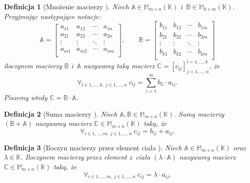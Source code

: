 \documentclass[12pt,a4paper]{report}
\newtheorem{df}{Definicja}[chapter]
\newcommand{\setK}{\mathbb{K}}
\begin{document}
\begin{df}[Mnożenie macierzy {\citep[Sec 9.3 Def 9.13]{alzega}}]
Niech $\mathbb{A} \in \mathbb{M}_{m \times n} (\setK)$ i~$\mathbb{B} \in \mathbb{M}_{k \times m} (\setK)$. Przyjmując następujące notacje:
$$
\mathbb{A} = \left[
        \begin{array}{cccc}
         a_{11} & a_{12} & \cdots & a_{1n} \\
         a_{21} & a_{22} & \cdots & a_{2n} \\
         \vdots & \vdots & \ddots & \vdots \\
         a_{m1} & a_{m2} & \cdots & a_{mn} \\
         \end{array}
      \right],
      \qquad
\mathbb{B} = \left[
        \begin{array}{cccc}
         b_{11} & b_{12} & \cdots & b_{1m} \\
         b_{21} & b_{22} & \cdots & b_{2m} \\
         \vdots & \vdots & \ddots & \vdots \\
         b_{k1} & b_{k2} & \cdots & b_{km} \\
         \end{array}
      \right]
$$
iloczynem macierzy $\mathbb{B}$ i~$\mathbb{A}$ nazywamy taką macierz $\mathbb{C} = [c_{lj}]_{j = 1, \ldots, n}^{l = 1, \ldots , k}$, że
$$
\forall_{l \in 1, \ldots, k, \: j \in 1, \ldots, n} \:c_{lj} = \sum_{i=1}^m b_{li} \cdot a_{ij}.
$$
Piszemy wtedy $\mathbb{C} = \mathbb{B} \cdot \mathbb{A}$.
\end{df}

\begin{df}[Suma macierzy {\citep[Sec 8.1]{alzega}}]
Niech $\mathbb{A}, \mathbb{B} \in \mathbb{M}_{m \times n} (\setK)$.
Sumą macierzy $(\mathbb{B} + \mathbb{A})$ nazywamy macierz $\mathbb{C} \in \mathbb{M}_{m \times n} (\setK)$ taką, że
$$
\forall_{i \in 1, \ldots, m, \: j \in 1, \ldots, n} \: c_{ij} = b_{ij} + a_{ij}.
$$
\end{df}

\begin{df}[Iloczyn macierzy przez element ciała {\citep[Sec 8.1]{alzega}}]
Niech $\mathbb{A} \in \mathbb{M}_{m \times n} (\setK)$ oraz $\lambda \in \setK$.
Iloczynem macierzy przez element z~ciała $(\lambda \cdot \mathbb{A})$ nazywamy macierz $\mathbb{C} \in \mathbb{M}_{m \times n} (\setK)$ taką, że
$$
\forall_{i \in 1, \ldots, m, \: j \in 1, \ldots, n} \: c_{ij} = \lambda \cdot a_{ij}.
$$
\end{df}
\end{document}
